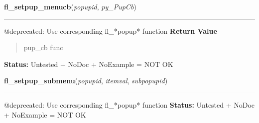     \vspace{0.5ex}

\hspace{.8\funcindent}\begin{boxedminipage}{\funcwidth}

    \raggedright \textbf{fl\_setpup\_menucb}(\textit{popupid}, \textit{py\_PupCb})

    \vspace{-1.5ex}

    \rule{\textwidth}{0.5\fboxrule}
\setlength{\parskip}{2ex}

@deprecated: Use corresponding fl\_*popup* function
\setlength{\parskip}{1ex}
      \textbf{Return Value}
    \vspace{-1ex}

      \begin{quote}

pup\_cb func
      \end{quote}

\textbf{Status:} 
Untested + NoDoc + NoExample = NOT OK


    \end{boxedminipage}

    \label{xformslib:deprecated:fl_setpup_submenu}

    \vspace{0.5ex}

\hspace{.8\funcindent}\begin{boxedminipage}{\funcwidth}

    \raggedright \textbf{fl\_setpup\_submenu}(\textit{popupid}, \textit{itemval}, \textit{subpopupid})

    \vspace{-1.5ex}

    \rule{\textwidth}{0.5\fboxrule}
\setlength{\parskip}{2ex}

@deprecated: Use corresponding fl\_*popup* function
\setlength{\parskip}{1ex}
\textbf{Status:} 
Untested + NoDoc + NoExample = NOT OK


    \end{boxedminipage}

    \label{xformslib:deprecated:fl_setpup_mode}

    \vspace{0.5ex}

